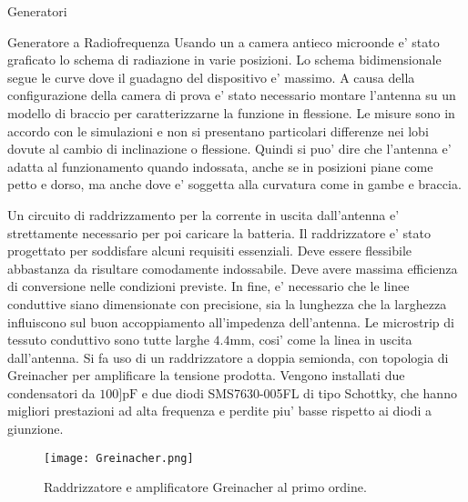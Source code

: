 \begin{section}{Generatori}
\begin{subsection}{Generatore a Radiofrequenza}
        Usando un a camera antieco microonde e' stato graficato lo schema di radiazione in varie posizioni. Lo schema bidimensionale segue le curve dove il guadagno del dispositivo e' massimo. A causa della configurazione della camera di prova e' stato necessario montare l'antenna su un modello di braccio per caratterizzarne la funzione in flessione. Le misure sono in accordo con le simulazioni e non si presentano particolari differenze nei lobi dovute al cambio di inclinazione o flessione. Quindi si puo' dire che l'antenna e' adatta al funzionamento quando indossata, anche se in posizioni piane come petto e dorso, ma anche dove e' soggetta alla curvatura come in gambe e braccia.

        Un circuito di raddrizzamento per la corrente in uscita dall'antenna e' strettamente necessario per poi caricare la batteria. Il raddrizzatore e' stato progettato per soddisfare alcuni requisiti essenziali. Deve essere flessibile abbastanza da risultare comodamente indossabile. Deve avere massima efficienza di conversione nelle condizioni previste. In fine, e' necessario che le linee conduttive siano dimensionate con precisione, sia la lunghezza che la larghezza influiscono sul buon accoppiamento all'impedenza dell'antenna. Le microstrip di tessuto conduttivo sono tutte larghe \(4.4\mathrm{mm}\), cosi' come la linea in uscita dall'antenna. Si fa uso di un raddrizzatore a doppia semionda, con topologia di Greinacher per amplificare la tensione prodotta. Vengono installati due condensatori da \(100]\mathrm{pF}\) e due diodi SMS7630-005FL di tipo Schottky, che hanno migliori prestazioni ad alta frequenza e perdite piu' basse rispetto ai diodi a giunzione. 

        \begin{figure}[H]
            \texttt{[image: Greinacher.png]}
            \centering
            \caption{Raddrizzatore e amplificatore Greinacher al primo ordine.}
            \label{fig:Greinacher}
        \end{figure}
        

\end{subsection}
\end{section}
